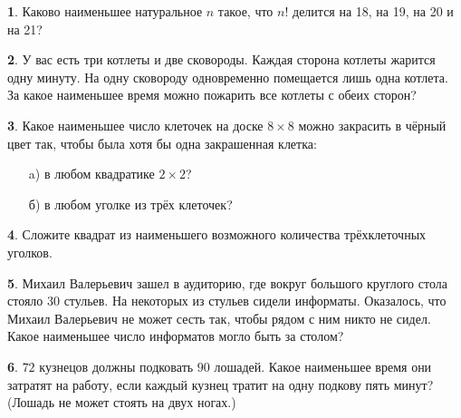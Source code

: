 \documentclass[b5paper,usehyperref, twoside]{article}
\theoremstyle{definition}
\theoremstyle{definition}
\newtheorem{Task}{}
\begin{document}
	\begin{Task}
		Каково наименьшее натуральное $n$ такое, что $n!$ делится на 18, на 19, на 20 и на 21?
	\end{Task}
	
	\begin{Task}
		У вас есть три котлеты и две сковороды. Каждая сторона котлеты жарится одну минуту. На одну сковороду одновременно помещается лишь одна котлета. За какое наименьшее время можно пожарить все котлеты с обеих сторон?
	\end{Task}
	
	
	\begin{Task}
		Какое наименьшее число клеточек на доске $8\times8$ можно закрасить в чёрный цвет так, чтобы была хотя бы одна закрашенная клетка:
		\begin{enumerate} 
			\item[a)] в любом квадратике $2\times2$?
			\item[б)] в любом уголке из трёх клеточек?
		\end{enumerate}
	\end{Task}
	
	\begin{Task}
		Сложите квадрат из наименьшего возможного количества трёхклеточных уголков. 
	\end{Task}
	
	
	\begin{Task}
		Михаил Валерьевич зашел в аудиторию, где вокруг большого круглого стола стояло 30 стульев. На некоторых из стульев сидели информаты. Оказалось, что Михаил Валерьевич не может сесть так, чтобы рядом с ним никто не сидел. Какое наименьшее число информатов могло быть за столом?
	\end{Task}
	
	
	\begin{Task} 
		$72$ кузнецов должны подковать $90$ лошадей. Какое наименьшее время они затратят на работу, если каждый кузнец тратит на одну подкову пять минут? (Лошадь не может стоять на двух ногах.)
	\end{Task}
	
	
%	
%	
	
\end{document}
